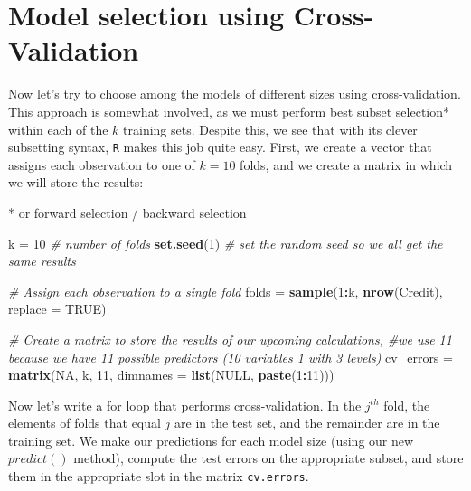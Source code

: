 \documentclass[
]{article}
\newenvironment{Shaded}{\begin{snugshade}}{\end{snugshade}}
\newcommand{\CommentTok}[1]{\textcolor[rgb]{0.56,0.35,0.01}{\textit{#1}}}
\newcommand{\DataTypeTok}[1]{\textcolor[rgb]{0.13,0.29,0.53}{#1}}
\newcommand{\DecValTok}[1]{\textcolor[rgb]{0.00,0.00,0.81}{#1}}
\newcommand{\KeywordTok}[1]{\textcolor[rgb]{0.13,0.29,0.53}{\textbf{#1}}}
\newcommand{\NormalTok}[1]{#1}
\newcommand{\OperatorTok}[1]{\textcolor[rgb]{0.81,0.36,0.00}{\textbf{#1}}}
\newcommand{\OtherTok}[1]{\textcolor[rgb]{0.56,0.35,0.01}{#1}}
\newcommand{\StringTok}[1]{\textcolor[rgb]{0.31,0.60,0.02}{#1}}
\begin{document}
\hypertarget{model-selection-using-cross-validation}{%
\section{Model selection using
Cross-Validation}\label{model-selection-using-cross-validation}}

Now let's try to choose among the models of different sizes using
cross-validation. This approach is somewhat involved, as we must perform
best subset selection* within each of the \(k\) training sets. Despite
this, we see that with its clever subsetting syntax, \texttt{R} makes
this job quite easy. First, we create a vector that assigns each
observation to one of \(k = 10\) folds, and we create a matrix in which
we will store the results:

* or forward selection / backward selection

\begin{Shaded}
\begin{Highlighting}[]
\NormalTok{k =}\StringTok{ }\DecValTok{10}        \CommentTok{# number of folds  }
\KeywordTok{set.seed}\NormalTok{(}\DecValTok{1}\NormalTok{)   }\CommentTok{# set the random seed so we all get the same results}

\CommentTok{# Assign each observation to a single fold}
\NormalTok{folds =}\StringTok{ }\KeywordTok{sample}\NormalTok{(}\DecValTok{1}\OperatorTok{:}\NormalTok{k, }\KeywordTok{nrow}\NormalTok{(Credit), }\DataTypeTok{replace =} \OtherTok{TRUE}\NormalTok{)}

\CommentTok{# Create a matrix to store the results of our upcoming calculations, }
\CommentTok{#we use 11 because we have 11 possible predictors (10 variables 1 with 3 levels)}
\NormalTok{cv_errors =}\StringTok{ }\KeywordTok{matrix}\NormalTok{(}\OtherTok{NA}\NormalTok{, k, }\DecValTok{11}\NormalTok{, }\DataTypeTok{dimnames =} \KeywordTok{list}\NormalTok{(}\OtherTok{NULL}\NormalTok{, }\KeywordTok{paste}\NormalTok{(}\DecValTok{1}\OperatorTok{:}\DecValTok{11}\NormalTok{)))}
\end{Highlighting}
\end{Shaded}

Now let's write a for loop that performs cross-validation. In the
\(j^{th}\) fold, the elements of folds that equal \(j\) are in the test
set, and the remainder are in the training set. We make our predictions
for each model size (using our new \(predict()\) method), compute the
test errors on the appropriate subset, and store them in the appropriate
slot in the matrix \texttt{cv.errors}.
\end{document}
